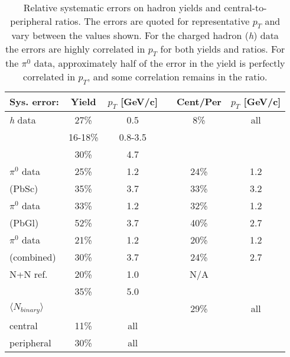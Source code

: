 \begin{multicols}{2}

\begin{table}
\caption[]{Relative systematic errors on hadron yields and 
	central-to-peripheral ratios.
	The errors are quoted for representative $p_{T}$ and 
	vary between the values shown.
	For the charged hadron ({\it h}) 
	data the errors are highly correlated in $p_{T}$ for both 
	yields and ratios.
	For the $\pi^0$ data, approximately half of the error in 
	the yield is perfectly correlated in $p_{T}$, and some 
	correlation remains in the ratio. 
	}
\begin{tabular}[]{lccccc}
Sys. error: & Yield & $p_{T}$ [GeV/c] & & Cent/Per  & $p_{T}$ [GeV/c] \\ 
\hline
{\it h} data & 27\% 	& 0.5 & 		& 8\% & all\\
	     & 16-18\% 	& 0.8-3.5	& &	&\\
	     & 30\%	& 4.7		& &	&\\ 
\hline 
$\pi^0$ data & 25\%	& 1.2	&	& 24\% & 1.2 \\
(PbSc)		& 35\%	& 3.7	&	& 33\%	&  3.2 \\ 
\hline
$\pi^0$ data & 33\%	& 1.2	&	& 32\% & 1.2 \\
(PbGl)		& 52\%	& 3.7	&	& 40\%	& 2.7 \\ 
\hline
$\pi^0$ data & 21\% & 1.2        &   & 20\% & 1.2 \\
(combined)       & 30\% & 3.7     &      & 24\% & 2.7 \\ 
\hline
N+N ref.	& 20\%  & 1.0	&	& N/A &\\
		& 35\%  & 5.0	&	&     &\\ 
\hline
$\langle N_{binary} \rangle$ & & & & 29\% & all\\
central & 11\%	& all	& & & \\
peripheral	& 30\%  & all    && 	& \\ 
\end{tabular}
\label{tab:syst}
\end{table}

\end{multicols}

 
 
 
